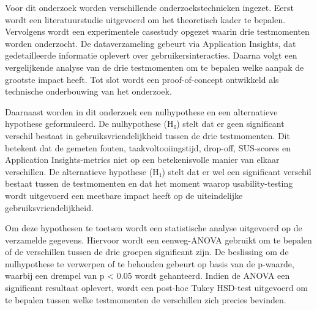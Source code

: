 Voor dit onderzoek worden verschillende onderzoekstechnieken ingezet. Eerst wordt een literatuurstudie uitgevoerd om het theoretisch kader te bepalen. Vervolgens wordt een experimentele casestudy opgezet waarin drie testmomenten worden onderzocht. De dataverzameling gebeurt via Application Insights, dat gedetailleerde informatie oplevert over gebruikersinteracties. Daarna volgt een vergelijkende analyse van de drie testmomenten om te bepalen welke aanpak de grootste impact heeft. Tot slot wordt een proof-of-concept ontwikkeld als technische onderbouwing van het onderzoek.

Daarnaast worden in dit onderzoek een nulhypothese en een alternatieve hypothese geformuleerd. De nulhypothese (H₀) stelt dat er geen significant verschil bestaat in gebruiksvriendelijkheid tussen de drie testmomenten. Dit betekent dat de gemeten fouten, taakvoltooiingstijd, drop-off, SUS-scores en Application Insights-metrics niet op een betekenisvolle manier van elkaar verschillen. De alternatieve hypothese (H₁) stelt dat er wel een significant verschil bestaat tussen de testmomenten en dat het moment waarop usability-testing wordt uitgevoerd een meetbare impact heeft op de uiteindelijke gebruiksvriendelijkheid.

Om deze hypothesen te toetsen wordt een statistische analyse uitgevoerd op de verzamelde gegevens. Hiervoor wordt een eenweg-ANOVA gebruikt om te bepalen of de verschillen tussen de drie groepen significant zijn. De beslissing om de nulhypothese te verwerpen of te behouden gebeurt op basis van de p-waarde, waarbij een drempel van p < 0.05 wordt gehanteerd. Indien de ANOVA een significant resultaat oplevert, wordt een post-hoc Tukey HSD-test uitgevoerd om te bepalen tussen welke testmomenten de verschillen zich precies bevinden.

